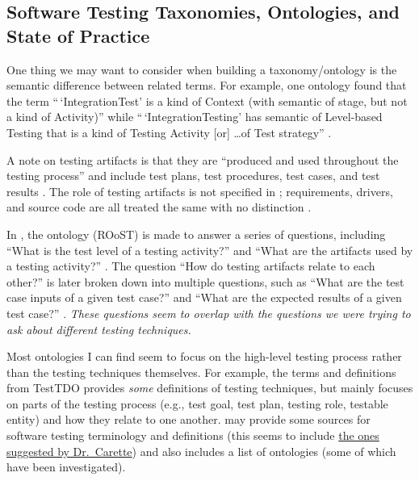 \subsection{Software Testing Taxonomies, Ontologies, and State of Practice}

One thing we may want to consider when building a taxonomy/ontology is the
semantic difference between related terms. For example, one ontology found
that the term ``\,`IntegrationTest' is a kind of Context (with
semantic of stage, but not a kind of Activity)'' while ``\,`IntegrationTesting'
has semantic of Level-based Testing that is a kind of Testing Activity [or]
\dots of Test strategy'' \citep[p.~157]{TebesEtAl2019}.

A note on testing artifacts is that they are ``produced and used throughout
the testing process'' and include test plans, test procedures, test cases, and
test results \citep[p.~3]{SouzaEtAl2017}. The role of testing
artifacts is not specified in \citep{BarbosaEtAl2006};
requirements, drivers, and source code are all treated the same
with no distinction \citep[p.~3]{BarbosaEtAl2006}.

In \citep{SouzaEtAl2017}, the ontology (ROoST)  is made to
answer a series of questions, including ``What is the test level of a testing
activity?'' and ``What are the artifacts used by a testing activity?''
\citep[pp.~8-9]{SouzaEtAl2017}. 
The question ``How do testing artifacts relate to each other?''
\citep[p.~8]{SouzaEtAl2017} is later broken down into multiple questions,
such as ``What are the test case inputs of a given test case?'' and ``What are
the expected results of a given test case?'' \citep[p.~21]{SouzaEtAl2017}.
\emph{These questions seem to overlap with the questions we were trying to ask
      about different testing techniques.}

Most ontologies I can find seem to focus on the high-level testing process
rather than the testing techniques themselves. For example, the terms and
definitions \citep{TebesEtAl2020b}
from TestTDO \citep{TebesEtAl2020a} provides \emph{some} definitions of
testing techniques, but mainly focuses on parts of the testing process
(e.g., test goal, test plan, testing role, testable entity) and how they relate
to one another. \citep[pp.~152-153]{TebesEtAl2019} may provide some
sources for software testing terminology and definitions (this seems to include
\href{https://github.com/samm82/TestGen-Thesis/issues/14#issuecomment-1839922715}
{the ones suggested by Dr.~Carette}) and also includes a list of ontologies
(some of which have been investigated).

